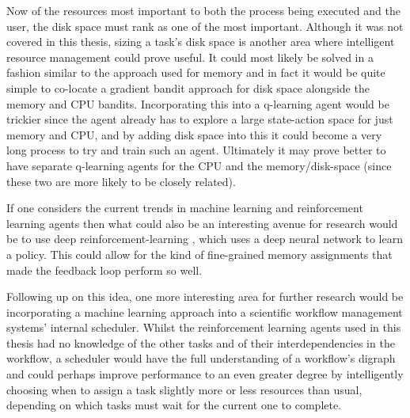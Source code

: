 Now of the resources most important to both the process being executed and the user, the disk space must rank as one of the most important. Although it was not covered in this thesis, sizing a task’s disk space is another area where intelligent resource management could prove useful. It could most likely be solved in a fashion similar to the approach used for memory and in fact it would be quite simple to co-locate a gradient bandit approach for disk space alongside the memory and CPU bandits. Incorporating this into a q-learning agent would be trickier since the agent already has to explore a large state-action space for just memory and CPU, and by adding disk space into this it could become a very long process to try and train such an agent. Ultimately it may prove better to have separate q-learning agents for the CPU and the memory/disk-space (since these two are more likely to be closely related).

If one considers the current trends in machine learning and reinforcement learning agents then what could also be an interesting avenue for research would be to use deep reinforcement-learning \cite{deepQ}, which uses a deep neural network to learn a policy. This could allow for the kind of fine-grained memory assignments that made the feedback loop perform so well.

Following up on this idea, one more interesting area for further research would be incorporating a machine learning approach into a scientific workflow management systems’ internal scheduler. Whilst the reinforcement learning agents used in this thesis had no knowledge of the other tasks and of their interdependencies in the workflow, a scheduler would have the full understanding of a workflow’s digraph and could perhaps improve performance to an even greater degree by intelligently choosing when to assign a task slightly more or less resources than usual, depending on which tasks must wait for the current one to complete. 

